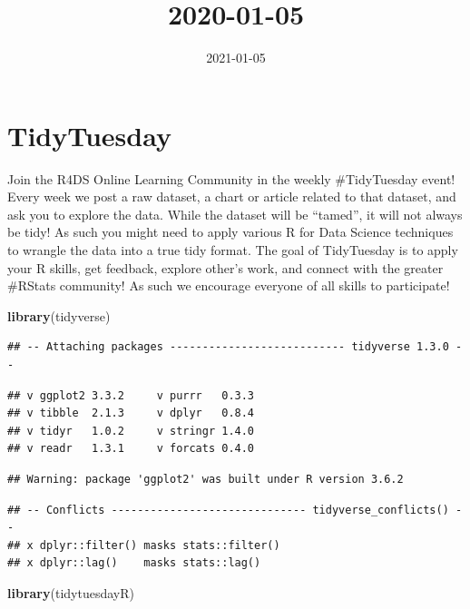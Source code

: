 \documentclass[]{article}
\title{2020-01-05}
\author{}
\date{\vspace{-2.5em}2021-01-05}
\newenvironment{Shaded}{\begin{snugshade}}{\end{snugshade}}
\newcommand{\KeywordTok}[1]{\textcolor[rgb]{0.13,0.29,0.53}{\textbf{#1}}}
\newcommand{\NormalTok}[1]{#1}
\begin{document}
\maketitle

\hypertarget{tidytuesday}{%
\section{TidyTuesday}\label{tidytuesday}}

Join the R4DS Online Learning Community in the weekly \#TidyTuesday
event! Every week we post a raw dataset, a chart or article related to
that dataset, and ask you to explore the data. While the dataset will be
``tamed'', it will not always be tidy! As such you might need to apply
various R for Data Science techniques to wrangle the data into a true
tidy format. The goal of TidyTuesday is to apply your R skills, get
feedback, explore other's work, and connect with the greater \#RStats
community! As such we encourage everyone of all skills to participate!

\begin{Shaded}
\begin{Highlighting}[]
\KeywordTok{library}\NormalTok{(tidyverse)}
\end{Highlighting}
\end{Shaded}

\begin{verbatim}
## -- Attaching packages --------------------------- tidyverse 1.3.0 --
\end{verbatim}

\begin{verbatim}
## v ggplot2 3.3.2     v purrr   0.3.3
## v tibble  2.1.3     v dplyr   0.8.4
## v tidyr   1.0.2     v stringr 1.4.0
## v readr   1.3.1     v forcats 0.4.0
\end{verbatim}

\begin{verbatim}
## Warning: package 'ggplot2' was built under R version 3.6.2
\end{verbatim}

\begin{verbatim}
## -- Conflicts ------------------------------ tidyverse_conflicts() --
## x dplyr::filter() masks stats::filter()
## x dplyr::lag()    masks stats::lag()
\end{verbatim}

\begin{Shaded}
\begin{Highlighting}[]
\KeywordTok{library}\NormalTok{(tidytuesdayR)}
\end{Highlighting}
\end{Shaded}
\end{document}
